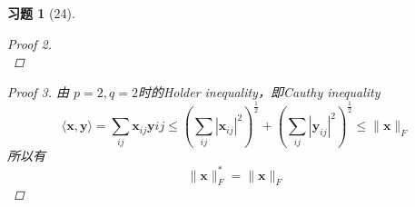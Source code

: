 \documentclass[a4paper, UTF8]{ctexart}
\newtheorem*{exercise}{\textbf{习题}}
\begin{document}
\begin{exercise}[24]
\begin{proof}[Proof 2]
\begin{equation*}
    \end{equation*}
  \end{proof}
  \begin{proof}[Proof 3]
    由 $p=2,q=2$时的Holder inequality，即Cauthy inequality
    \begin{equation*}
      \langle \mathbf{x}, \mathbf{y} \rangle = \sum_{ij}\mathbf{x}_{ij}\mathbf{y}{ij} \le \left( \sum_{ij} |\mathbf{x}_{ij}|^2 \right)^{\frac{1}{2}} + \left( \sum_{ij} |\mathbf{y}_{ij}|^2 \right)^{\frac{1}{2}} \le \lVert \mathbf{x} \rVert_F
    \end{equation*}
    所以有
    \begin{equation*}
      \lVert \mathbf{x} \rVert_F^* = \lVert \mathbf{x} \rVert_F
    \end{equation*}
  \end{proof}
\end{exercise}
\end{document}
